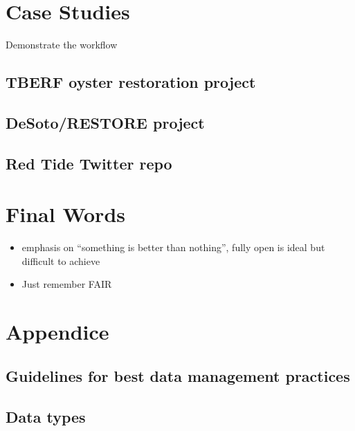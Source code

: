 \documentclass[
]{book}
\providecommand{\tightlist}{%
  \setlength{\itemsep}{0pt}\setlength{\parskip}{0pt}}
\begin{document}
\hypertarget{cases}{%
\chapter{Case Studies}\label{cases}}

Demonstrate the workflow

\hypertarget{tberf-oyster-restoration-project}{%
\section{TBERF oyster restoration project}\label{tberf-oyster-restoration-project}}

\hypertarget{desotorestore-project}{%
\section{DeSoto/RESTORE project}\label{desotorestore-project}}

\hypertarget{red-tide-twitter-repo}{%
\section{Red Tide Twitter repo}\label{red-tide-twitter-repo}}

\hypertarget{final}{%
\chapter{Final Words}\label{final}}

\begin{itemize}
\tightlist
\item
  emphasis on ``something is better than nothing'', fully open is ideal but difficult to achieve
\item
  Just remember FAIR
\end{itemize}

\hypertarget{appendices}{%
\chapter{Appendice}\label{appendices}}

\hypertarget{guidelines-for-best-data-management-practices}{%
\section{Guidelines for best data management practices}\label{guidelines-for-best-data-management-practices}}

\hypertarget{data-types}{%
\section{Data types}\label{data-types}}
\end{document}
